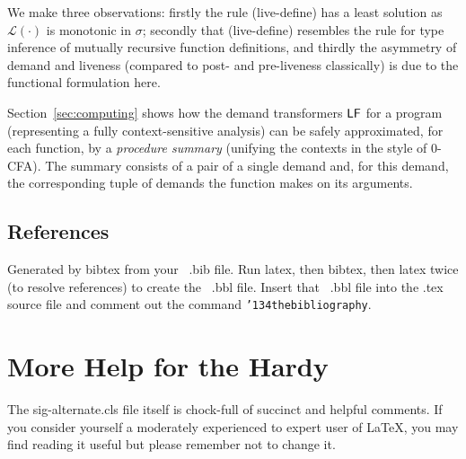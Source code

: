 \documentclass{sig-alternate}
\newcommand{\comment}[1]{{\color{Myblue}{\medskip \hrule\medskip
    #1 \medskip \hrule \medskip}}}
\begin{document}
We make three observations: firstly the rule ({\sc live-define}) has a
least  solution  as  $\mathcal{L}(\cdot)$  is monotonic  in  $\sigma$;
secondly  that  ({\sc  live-define})   resembles  the  rule  for  type
inference of mutually recursive  function definitions, and thirdly the
asymmetry of  demand and liveness (compared to  post- and pre-liveness
classically) is due to the functional formulation here.

Section~\ref{sec:computing} shows how the demand transformers $\mathsf{LF}$ for a program
(representing a fully context-sensitive analysis)
can be safely approximated, for each function, by a {\em procedure summary}
(unifying the contexts in the style of 0-CFA)\@.
The summary consists of a pair of a single demand and, for this demand,
the corresponding tuple of demands the function makes on its
arguments.














\subsection{References}
{}


Generated by bibtex from your ~.bib file.  Run latex,
then bibtex, then latex twice (to resolve references)
to create the ~.bbl file.  Insert that ~.bbl file into
the .tex source file and comment out
the command \texttt{{\char'134}thebibliography}.
\section{More Help for the Hardy}
The sig-alternate.cls file itself is chock-full of succinct
and helpful comments.  If you consider yourself a moderately
experienced to expert user of \LaTeX, you may find reading
it useful but please remember not to change it.
\end{document}
